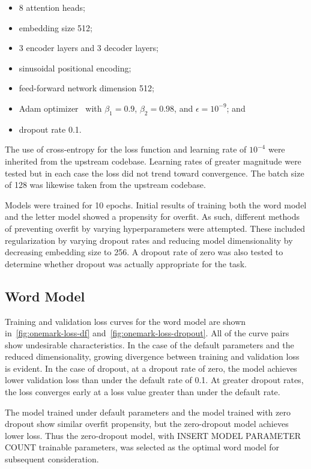 \documentclass[letterpaper]{article} %
\begin{document}
\begin{NoHyper}
\begin{itemize}
\item 8 attention heads;
\item embedding size 512;
\item 3 encoder layers and 3 decoder layers;
\item sinusoidal positional encoding;
\item feed-forward network dimension 512;
\item Adam optimizer~\cite{kingma2017adam} with $\beta_1 = 0.9$, $\beta_2 = 0.98$, and $\epsilon = 10^{-9}$; and
\item dropout rate 0.1.
\end{itemize}

The use of cross-entropy for the loss function and learning rate of $10^{-4}$ were inherited from the upstream codebase.
Learning rates of greater magnitude were tested but in each case the loss did not trend toward convergence.
The batch size of 128 was likewise taken from the upstream codebase.

Models were trained for 10 epochs.
Initial results of training both the word model and the letter model showed a propensity for overfit.
As such, different methods of preventing overfit by varying hyperparameters were attempted.
These included regularization by varying dropout rates and reducing model dimensionality by decreasing embedding size to 256.
A dropout rate of zero was also tested to determine whether dropout was actually appropriate for the task.

\subsection{Word Model}
\label{subsec:word}

Training and validation loss curves for the word model are shown in~\ref{fig:onemark-loss-df} and~\ref{fig:onemark-loss-dropout}.
All of the curve pairs show undesirable characteristics.
In the case of the default parameters and the reduced dimensionality, growing divergence between training and validation loss is evident.
In the case of dropout, at a dropout rate of zero, the model achieves lower validation loss than under the default rate of 0.1. At greater dropout rates, the loss converges  early at a loss value greater than under the default rate.

The model trained under default parameters and the model trained with zero dropout show similar overfit propensity, but the zero-dropout model achieves lower loss.
Thus the zero-dropout model, with INSERT MODEL PARAMETER COUNT trainable parameters, was selected as the optimal word model for subsequent consideration.


\end{NoHyper}
\end{document}
